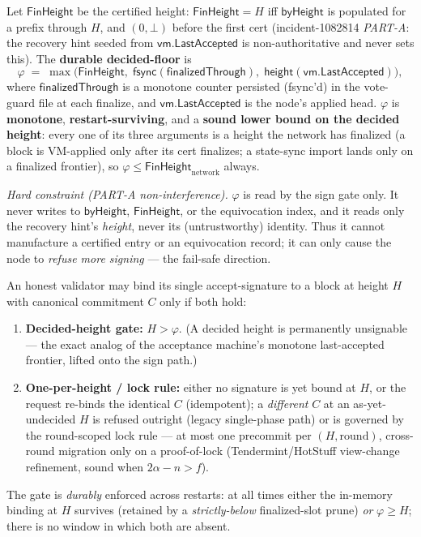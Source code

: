 \begin{definition}
\label{def:decided-floor}
Let $\mathsf{FinHeight}$ be the certified height:
$\mathsf{FinHeight} = H$ iff $\mathsf{byHeight}$ is populated for a
prefix through $H$, and $(0,\bot)$ before the first cert
(incident-1082814 \emph{PART-A}: the recovery hint seeded from
$\mathsf{vm.LastAccepted}$ is non-authoritative and never sets this).
The \textbf{durable decided-floor} is
\[
  \varphi \;=\; \max\!\bigl(
      \mathsf{FinHeight},\;
      \mathsf{fsync}(\mathsf{finalizedThrough}),\;
      \mathsf{height}(\mathsf{vm.LastAccepted})
  \bigr),
\]
where $\mathsf{finalizedThrough}$ is a monotone counter persisted
(fsync'd) in the vote-guard file at each finalize, and
$\mathsf{vm.LastAccepted}$ is the node's applied head. $\varphi$ is
\textbf{monotone}, \textbf{restart-surviving}, and a \textbf{sound lower
bound on the decided height}: every one of its three arguments is a
height the network has finalized (a block is VM-applied only after its
cert finalizes; a state-sync import lands only on a finalized frontier),
so $\varphi \le \mathsf{FinHeight}_{\text{network}}$ always.

\emph{Hard constraint (PART-A non-interference).} $\varphi$ is read by
the sign gate only. It never writes to $\mathsf{byHeight}$,
$\mathsf{FinHeight}$, or the equivocation index, and it reads only the
recovery hint's \emph{height}, never its (untrustworthy) identity. Thus
it cannot manufacture a certified entry or an equivocation record; it
can only cause the node to \emph{refuse more signing} --- the fail-safe
direction.
\end{definition}

\begin{definition}
\label{def:sign-admissible}
An honest validator may bind its single accept-signature to a block at
height $H$ with canonical commitment $C$ only if both hold:
\begin{enumerate}[nosep]
  \item \textbf{Decided-height gate:} $H > \varphi$. (A decided height is
        permanently unsignable --- the exact analog of the acceptance
        machine's monotone last-accepted frontier, lifted onto the sign
        path.)
  \item \textbf{One-per-height / lock rule:} either no signature is yet
        bound at $H$, or the request re-binds the identical $C$
        (idempotent); a \emph{different} $C$ at an as-yet-undecided $H$
        is refused outright (legacy single-phase path) or is governed by
        the round-scoped lock rule --- at most one precommit per
        $(H,\text{round})$, cross-round migration only on a
        proof-of-lock (Tendermint/HotStuff view-change refinement, sound
        when $2\alpha - n > f$).
\end{enumerate}
The gate is \emph{durably} enforced across restarts: at all times
either the in-memory binding at $H$ survives (retained by a
\emph{strictly-below} finalized-slot prune) \emph{or} $\varphi \ge H$;
there is no window in which both are absent.
\end{definition}

